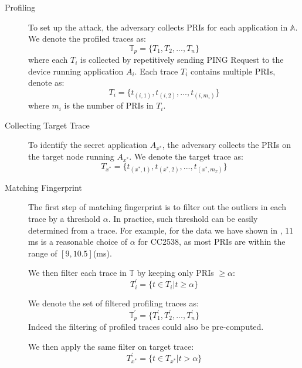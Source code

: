 \begin{description}
	\item[Profiling]
	To set up the attack, the adversary collects PRIs for each application in $\mathbb{A}$. We denote the profiled traces as:
	\begin{equation}
		\mathbb{T}_p = \{T_1, T_2, ..., T_n\}
	\end{equation}
where each $T_i$ is collected by repetitively sending PING Request to the device running application $A_i$. Each trace $T_i$ contains multiple PRIs, denote as:
	\begin{equation}
		T_i = \{t_{(i,1)}, t_{(i,2)}, ..., t_{(i,{m_i})}\} %
	\end{equation}
	where $m_i$ is the number of PRIs in $T_i$.

	\item[Collecting Target Trace]
	To identify the secret application $A_{x^*}$, the adversary collects the PRIs on the target node running $A_{x^*}$. We denote the target trace as:
	\begin{equation}
		T_{x^*} = \{ t_{(x^*,1)}, t_{(x^*,2)}, ..., t_{(x^*,{m_x})}\} %
	\end{equation}
	
	\item[Matching Fingerprint]
	The first step of matching fingerprint is to filter out the outliers in each trace by a threshold $\alpha$. In practice, such threshold can be easily determined from a trace. For example, for the data we have shown in , $11$ms is a reasonable choice of $\alpha$ for CC2538, as most PRIs are within the range of $[9,10.5]$(ms).
	
	We then filter each trace in $\mathbb{T}$ by keeping only PRIs $\geq \alpha$:
	\begin{equation}
		T^{\prime}_{i} = \{t \in T_i | t \geq \alpha\}
	\end{equation}
	
	We denote the set of filtered profiling traces as:
	\begin{equation}
		\mathbb{T}^{\prime}_{p} = \{ T^{\prime}_1, T^{\prime}_2, ..., T^{\prime}_n\}
	\end{equation}
	Indeed the filtering of profiled traces could also be pre-computed.
	
	We then apply the same filter on target trace:
	\begin{equation}
		T^{\prime}_{x^*} =  \{t \in T_{x^*} | t > \alpha\}
	\end{equation}
	

\end{description}
